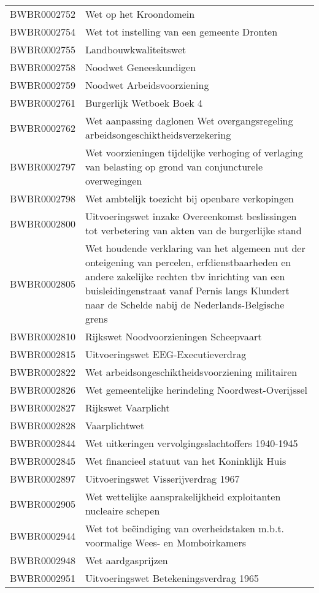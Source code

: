 \begin{longtable}{lp{}}
BWBR0002752 & Wet op het Kroondomein \\
BWBR0002754 & Wet tot instelling van een gemeente Dronten \\
BWBR0002755 & Landbouwkwaliteitswet \\
BWBR0002758 & Noodwet Geneeskundigen \\
BWBR0002759 & Noodwet Arbeidsvoorziening \\
BWBR0002761 & Burgerlijk Wetboek Boek 4 \\
BWBR0002762 & Wet aanpassing daglonen Wet overgangsregeling arbeidsongeschiktheidsverzekering \\
BWBR0002797 & Wet voorzieningen tijdelijke verhoging of verlaging van belasting op grond van conjuncturele overwegingen \\
BWBR0002798 & Wet ambtelijk toezicht bij openbare verkopingen \\
BWBR0002800 & Uitvoeringswet inzake Overeenkomst beslissingen tot verbetering van akten van de burgerlijke stand \\
BWBR0002805 & Wet houdende verklaring van het algemeen nut der onteigening van percelen, erfdienstbaarheden en andere zakelijke rechten tbv inrichting van een buisleidingenstraat vanaf Pernis langs Klundert naar de Schelde nabij de Nederlands-Belgische grens \\
BWBR0002810 & Rijkswet Noodvoorzieningen Scheepvaart \\
BWBR0002815 & Uitvoeringswet EEG-Executieverdrag \\
BWBR0002822 & Wet arbeidsongeschiktheidsvoorziening militairen \\
BWBR0002826 & Wet gemeentelijke herindeling Noordwest-Overijssel \\
BWBR0002827 & Rijkswet Vaarplicht \\
BWBR0002828 & Vaarplichtwet \\
BWBR0002844 & Wet uitkeringen vervolgingsslachtoffers 1940-1945 \\
BWBR0002845 & Wet financieel statuut van het Koninklijk Huis \\
BWBR0002897 & Uitvoeringswet Visserijverdrag 1967 \\
BWBR0002905 & Wet wettelijke aansprakelijkheid exploitanten nucleaire schepen \\
BWBR0002944 & Wet tot beëindiging van overheidstaken m.b.t. voormalige Wees- en Momboirkamers \\
BWBR0002948 & Wet aardgasprijzen \\
BWBR0002951 & Uitvoeringswet Betekeningsverdrag 1965 \\

\end{longtable}
